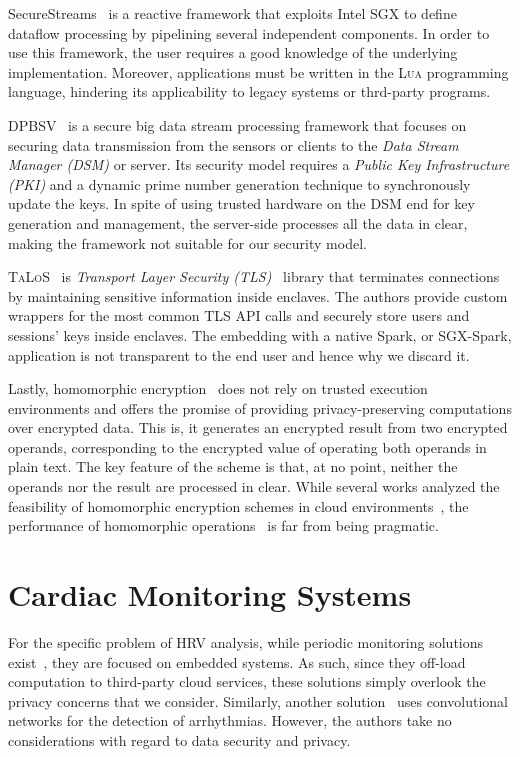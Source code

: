SecureStreams~\cite{Havet2017} is a reactive framework that exploits Intel SGX to define dataflow processing by pipelining several independent components. 
In order to use this framework, the user requires a good knowledge of the underlying implementation. 
Moreover, applications must be written in the \textsc{Lua} programming language, hindering its applicability to legacy systems or thrd-party programs.

\textsc{DPBSV}~\cite{Puthal2015} is a secure big data stream processing framework that focuses on securing data transmission from the sensors or clients to the \textit{Data Stream Manager (DSM)} or server. 
Its security model requires a \textit{Public Key Infrastructure (PKI)} and a dynamic prime number generation technique to synchronously update the keys. 
In spite of using trusted hardware on the DSM end for key generation and management, the server-side processes all the data in clear, making the framework not suitable for our security model. 

\textsc{TaLoS}~\cite{Aublin2017} is \textit{Transport Layer Security (TLS)}~\cite{Dierks2008} library that terminates connections by maintaining sensitive information inside enclaves. 
The authors provide custom wrappers for the most common \textsc{TLS} API calls and securely store users and sessions' keys inside enclaves.
The embedding with a native Spark, or SGX-Spark, application is not transparent to the end user and hence why we discard it.

Lastly, homomorphic encryption~\cite{Gentry2009} does not rely on trusted execution environments and offers the promise of providing privacy-preserving computations over encrypted data.
This is, it generates an encrypted result from two encrypted operands, corresponding to the encrypted value of operating both operands in plain text.
The key feature of the scheme is that, at no point, neither the operands nor the result are processed in clear.
While several works analyzed the feasibility of homomorphic encryption schemes in cloud environments~\cite{Tetali2013,Stephen2016}, the performance of homomorphic operations~\cite{Gottel2018} is far from being pragmatic.

\section{Cardiac Monitoring Systems} \label{sec:related:cardiac}
For the specific problem of HRV analysis, while periodic monitoring solutions exist~\cite{Renevey2018}, they are focused on embedded systems.
As such, since they off-load computation to third-party cloud services, these solutions simply overlook the privacy concerns that we consider.
Similarly, another solution~\cite{VanZaen2019} uses convolutional networks for the detection of arrhythmias.
However, the authors take no considerations with regard to data security and privacy.

